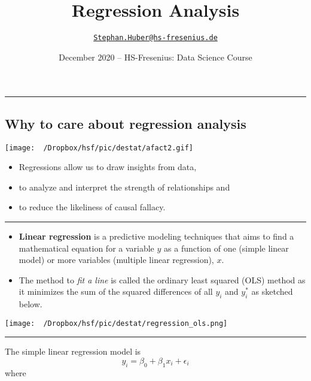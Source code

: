 \documentclass[
]{article}
\title{Regression Analysis}
\author{\href{mailto:Stephan.Huber@hs-fresenius.de}{\nolinkurl{Stephan.Huber@hs-fresenius.de}}}
\date{December 2020 -- HS-Fresenius: Data Science Course}
\providecommand{\tightlist}{%
  \setlength{\itemsep}{0pt}\setlength{\parskip}{0pt}}
\begin{document}
\maketitle

{
\setcounter{tocdepth}{4}
\tableofcontents
}
\begin{center}\rule{0.5\linewidth}{0.5pt}\end{center}

\hypertarget{why-to-care-about-regression-analysis}{%
\subsection{Why to care about regression
analysis}\label{why-to-care-about-regression-analysis}}

\texttt{[image: ~/Dropbox/hsf/pic/destat/afact2.gif]}

\begin{itemize}
\tightlist
\item
  Regressions allow us to draw insights from data,
\item
  to analyze and interpret the strength of relationships and
\item
  to reduce the likeliness of causal fallacy.
\end{itemize}

\begin{center}\rule{0.5\linewidth}{0.5pt}\end{center}

\begin{itemize}
\item
  \textbf{Linear regression} is a predictive modeling techniques that
  aims to find a mathematical equation for a variable \(y\) as a
  function of one (simple linear model) or more variables (multiple
  linear regression), \(x\).
\item
  The method to \textit{fit a line} is called the ordinary least squared
  (OLS) method as it minimizes the sum of the squared differences of all
  \(y_i\) and \(y_i^*\) as sketched below.
\end{itemize}

\texttt{[image: ~/Dropbox/hsf/pic/destat/regression\_ols.png]}

\begin{center}\rule{0.5\linewidth}{0.5pt}\end{center}

The simple linear regression model is \[
y_i = \beta_{0} + \beta_{1} x_i + \epsilon_i
\] where
\end{document}
